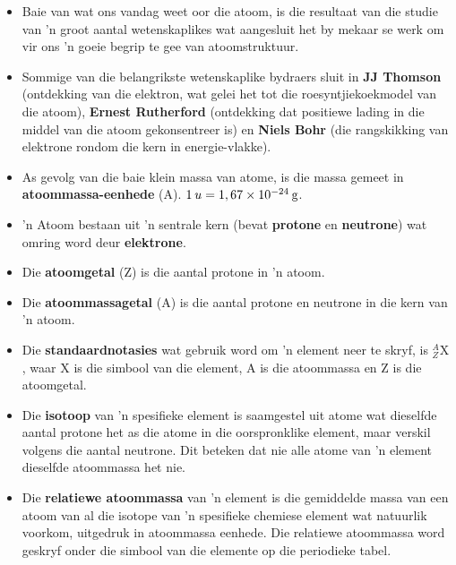     \label{m38741*cid10}
\nopagebreak
\begin{itemize}[noitemsep]
\item Baie van wat ons vandag weet oor die atoom, is die resultaat van die studie van 'n groot aantal wetenskaplikes wat aangesluit het by mekaar se werk om vir ons 'n goeie begrip te gee van atoomstruktuur.
\item Sommige van die belangrikste wetenskaplike bydraers sluit in \textbf{JJ Thomson} (ontdekking van die elektron, wat gelei het tot die roesyntjiekoekmodel van die atoom), \textbf{Ernest Rutherford} (ontdekking dat positiewe lading in die middel van die atoom gekonsentreer is) en \textbf{Niels Bohr} (die rangskikking van elektrone rondom die kern in energie-vlakke).
\item As gevolg van die baie klein massa van atome, is die massa gemeet in \textbf{atoommassa-eenhede} (A). $1\phantom{\rule{2pt}{0ex}}u=1,67\ensuremath{\times}10{}^{-24}\phantom{\rule{2pt}{0ex}}\text{g}$.
\item 'n Atoom bestaan uit 'n sentrale kern (bevat \textbf{protone} en \textbf{neutrone}) wat omring word deur \textbf{elektrone}.
\item Die \textbf{atoomgetal} (Z) is die aantal protone in 'n atoom.
\item Die \textbf{atoommassagetal} (A) is die aantal protone en neutrone in die kern van 'n atoom.
\item Die \textbf{standaardnotasies} wat gebruik word om 'n element neer te skryf, is $_{Z}^{A}\text{X}$, waar X is die simbool van die element, A is die atoommassa en Z is die atoomgetal.
\item Die \textbf{isotoop} van 'n spesifieke element is saamgestel uit atome wat dieselfde aantal protone het as die atome in die oorspronklike element, maar verskil volgens die aantal neutrone. Dit beteken dat nie alle atome van 'n element dieselfde atoommassa het nie.
\item Die \textbf{relatiewe atoommassa} van 'n element is die gemiddelde massa van een atoom van al die isotope van 'n spesifieke chemiese element wat natuurlik voorkom, uitgedruk in atoommassa eenhede. Die relatiewe atoommassa word geskryf onder die simbool van die elemente op die periodieke tabel.

\end{itemize}
